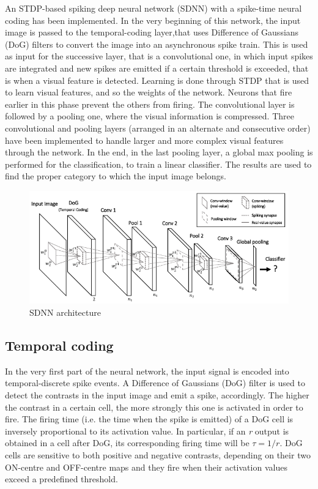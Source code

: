 \documentclass[11pt,a4paper]{scrartcl}
\begin{document}
An STDP-based spiking deep neural network (SDNN) with a spike-time neural coding has been implemented. In the very beginning of this network, the input image is passed to the temporal-coding layer,that uses Difference of Gaussians (DoG) filters to convert the image into an asynchronous spike train. This is used as input for the successive layer, that is a convolutional one,
in which input spikes are integrated and new spikes are emitted if a certain threshold is exceeded, that is when a visual feature is detected. Learning is done through STDP that is used to learn visual features, and so the weights of the network. Neurons that fire earlier in this phase prevent the others from firing. The convolutional layer is followed by a pooling one, where the visual information is compressed. Three convolutional and pooling layers (arranged in an alternate and consecutive order) have been implemented to handle larger and more complex visual features through the network. In the end, in the last pooling layer, a global max pooling is performed for the classification, to train a linear classifier. The results are used to find the proper category to which the input image belongs.\\
\begin{figure}[h]
	\centering
	\includegraphics[width=\textwidth]{images/architecture}
	\caption{SDNN architecture}
	\label{fig:architecture}
\end{figure}

\subsection{Temporal coding}

In the very first part of the neural network, the input signal is encoded into temporal-discrete spike events. A Difference of Gaussians (DoG) filter is used to detect the contrasts in the input image and emit a spike, accordingly. The higher the contrast in a certain cell, the more strongly this one is activated in order to fire. The firing time (i.e. the time when the spike is emitted) of a DoG cell is inversely proportional to its activation value. In particular, if an \textit{r} output is obtained in a cell after DoG, its corresponding firing time will be $ \tau = 1/r $. DoG cells are sensitive to both positive and negative contrasts, depending on their two ON-centre and OFF-centre maps and they fire when their activation values exceed a predefined threshold.
\end{document}
